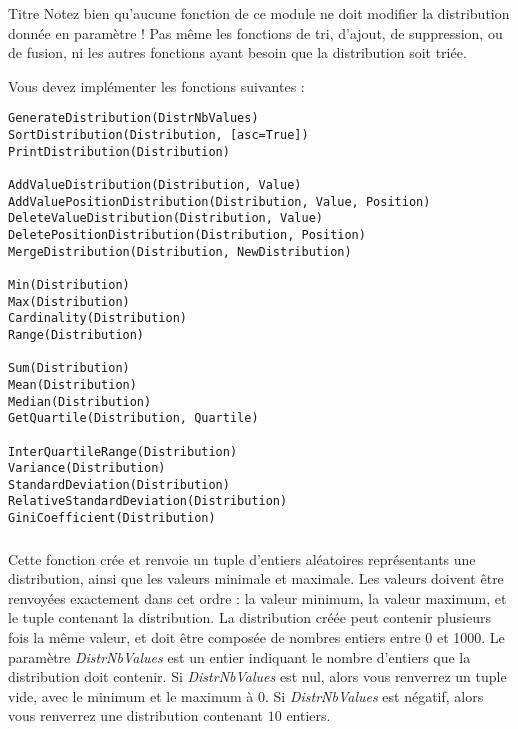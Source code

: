 \bigskip

\begin{RedBoxTitle}{Titre}
Notez bien qu'aucune fonction de ce module ne doit modifier la distribution donnée en paramètre !
Pas même les fonctions de tri, d'ajout, de suppression, ou de fusion, ni les autres fonctions ayant besoin que la distribution soit triée.
\end{RedBoxTitle}


\newpage

\noindent Vous devez implémenter les fonctions suivantes :

\bigskip

\lstset{language=python}
\begin{lstlisting}[frame=single,title={Liste des fonctions pour le module de statistiques}]
GenerateDistribution(DistrNbValues)
SortDistribution(Distribution, [asc=True])
PrintDistribution(Distribution)

AddValueDistribution(Distribution, Value)
AddValuePositionDistribution(Distribution, Value, Position)
DeleteValueDistribution(Distribution, Value)
DeletePositionDistribution(Distribution, Position)
MergeDistribution(Distribution, NewDistribution)

Min(Distribution)
Max(Distribution)
Cardinality(Distribution)
Range(Distribution)

Sum(Distribution)
Mean(Distribution)
Median(Distribution)
GetQuartile(Distribution, Quartile)

InterQuartileRange(Distribution)
Variance(Distribution)
StandardDeviation(Distribution)
RelativeStandardDeviation(Distribution)
GiniCoefficient(Distribution) \end{lstlisting}




\subsubsection*{}

\noindent Cette fonction crée et renvoie un tuple d'entiers aléatoires représentants une distribution, ainsi que les valeurs minimale et maximale.
Les valeurs doivent être renvoyées exactement dans cet ordre : la valeur minimum, la valeur maximum, et le tuple contenant la distribution.
La distribution créée peut contenir plusieurs fois la même valeur, et doit être composée de nombres entiers entre 0 et 1000.
Le paramètre \textit{DistrNbValues} est un entier indiquant le nombre d'entiers que la distribution doit contenir.
Si \textit{DistrNbValues} est nul, alors vous renverrez un tuple vide, avec le minimum et le maximum à $ 0 $.
Si \textit{DistrNbValues} est négatif, alors vous renverrez une distribution contenant $ 10 $ entiers.



